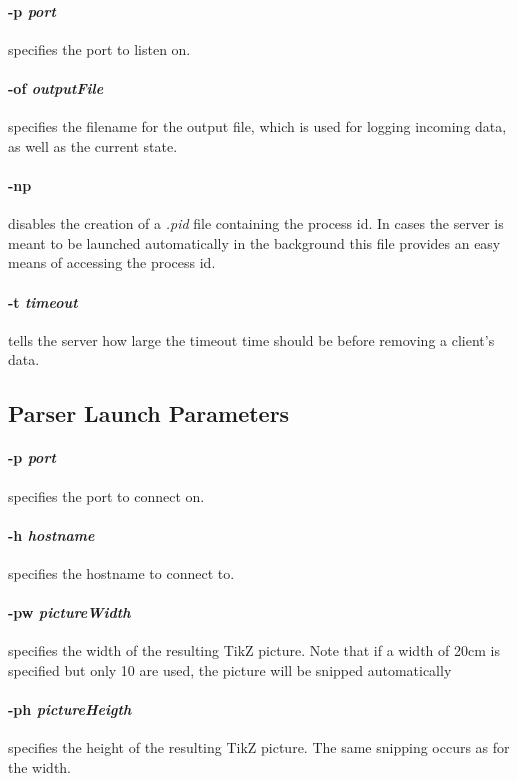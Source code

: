\paragraph{-p \textit{port}} specifies the port to listen on.

\paragraph{-of \textit{outputFile}} specifies the filename for the output file, which is used for logging incoming data, as well as the current state.

\paragraph{-np} disables the creation of a \textit{.pid} file containing the process id.
In cases the server is meant to be launched automatically in the background this file provides an easy means of accessing the process id.

\paragraph{-t \textit{timeout}} tells the server how large the timeout time should be before removing a client's data.

\subsection*{Parser Launch Parameters}
\paragraph{-p \textit{port}} specifies the port to connect on.

\paragraph{-h \textit{hostname}} specifies the hostname to connect to.

\paragraph{-pw \textit{pictureWidth}} specifies the width of the resulting TikZ picture.
Note that if a width of 20cm is specified but only 10 are used, the picture will be snipped automatically

\paragraph{-ph \textit{pictureHeigth}} specifies the height of the resulting TikZ picture.
The same snipping occurs as for the width.


